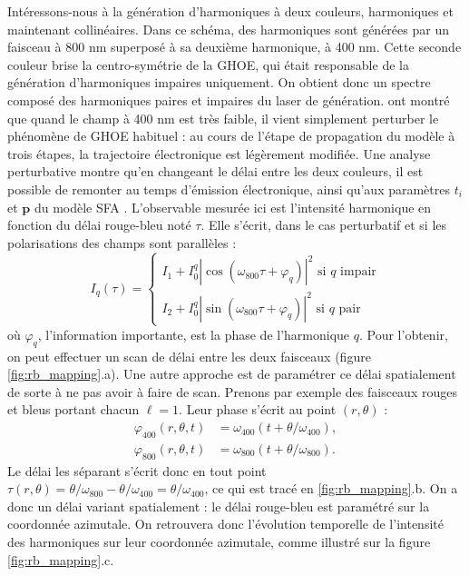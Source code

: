 Intéressons-nous à la génération d'harmoniques à deux couleurs, harmoniques et maintenant collinéaires. Dans ce schéma, des harmoniques sont générées par un faisceau à 800 nm superposé à sa deuxième harmonique, à 400 nm. Cette seconde couleur brise la centro-symétrie de la GHOE, qui était responsable de la génération d'harmoniques impaires uniquement. On obtient donc un spectre composé des harmoniques paires et impaires du laser de génération.  ont montré que quand le champ à 400 nm est très faible, il vient simplement perturber le phénomène de GHOE habituel : au cours de l'étape de propagation du modèle à trois étapes, la trajectoire électronique est légèrement modifiée. Une analyse perturbative montre qu'en changeant le délai entre les deux couleurs, il est possible de remonter au temps d'émission électronique, ainsi qu'aux paramètres $t_i$ et $\bm{p}$ du modèle SFA . L'observable mesurée ici est l'intensité harmonique en fonction du délai rouge-bleu noté $\tau$. Elle s'écrit, dans le cas perturbatif et si les polarisations des champs sont parallèles :
\begin{equation}
I_q(\tau)=
\begin{cases}
I_1 + I^q_0\left|\cos(\omega_{800}\tau+\varphi_q)\right|^2\text{ si $q$ impair}\\
I_2 + I^q_0\left|\sin(\omega_{800}\tau+\varphi_q)\right|^2\text{ si $q$ pair}
\end{cases}
\label{eq:oren}
\end{equation}
où $\varphi_q$, l'information importante, est la phase de l'harmonique $q$. Pour l'obtenir, on peut effectuer un scan de délai entre les deux faisceaux (figure \ref{fig:rb_mapping}.a). Une autre approche est de paramétrer ce délai spatialement de sorte à ne pas avoir à faire de scan. Prenons par exemple des faisceaux rouges et bleus portant chacun $\ell=1$. Leur phase s'écrit au point $(r,\theta)$ :
\begin{align}
\varphi_{400}(r,\theta,t) &= \omega_{400}(t + \theta/\omega_{400}),\\
\varphi_{800}(r,\theta,t) &= \omega_{800}(t + \theta/\omega_{800}).
\end{align}
Le délai les séparant s'écrit donc en tout point $\tau(r,\theta) = \theta/\omega_{800}-\theta/\omega_{400} = \theta/\omega_{400}$, ce qui est tracé en \ref{fig:rb_mapping}.b. On a donc un délai variant spatialement : le délai rouge-bleu est paramétré sur la coordonnée azimutale. On retrouvera donc l'évolution temporelle de l'intensité des harmoniques sur leur coordonnée azimutale, comme illustré sur la figure \ref{fig:rb_mapping}.c.
